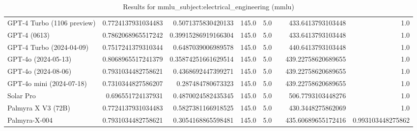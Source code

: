 \begin{table}[htp]
{\begin{tabular}{lrrrrrrr}
GPT-4 Turbo (1106 preview) & 0.7724137931034483 & 0.5071375830420133 & 145.0 & 5.0 &  & 433.6413793103448 & 1.0 \\
GPT-4 (0613) & 0.7862068965517242 & 0.39915286919166304 & 145.0 & 5.0 &  & 433.6413793103448 & 1.0 \\
GPT-4 Turbo (2024-04-09) & 0.7517241379310344 & 0.6487039006989578 & 145.0 & 5.0 &  & 440.6413793103448 & 1.0 \\
GPT-4o (2024-05-13) & 0.8068965517241379 & 0.35874251661629514 & 145.0 & 5.0 &  & 439.22758620689655 & 1.0 \\
GPT-4o (2024-08-06) & 0.7931034482758621 & 0.4368692447399271 & 145.0 & 5.0 &  & 439.22758620689655 & 1.0 \\
GPT-4o mini (2024-07-18) & 0.7310344827586207 & 0.287484780673323 & 145.0 & 5.0 &  & 439.22758620689655 & 1.0 \\
Solar Pro & 0.696551724137931 & 0.4870024582435345 & 145.0 & 5.0 &  & 506.7793103448276 & 1.0 \\
Palmyra X V3 (72B) & 0.7724137931034483 & 0.5827381166918525 & 145.0 & 5.0 &  & 430.3448275862069 & 1.0 \\
Palmyra-X-004 & 0.7931034482758621 & 0.3054168865598481 & 145.0 & 5.0 &  & 435.60689655172416 & 0.993103448275862 \\
\bottomrule
\end{tabular}}
\caption{Results for mmlu_subject:electrical_engineering (mmlu)}
\label{fig:mmlu_subject:electrical_engineering (mmlu)}
\end{table}